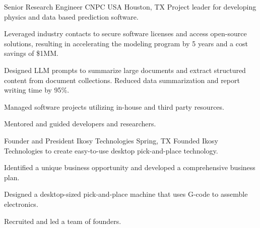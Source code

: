 \documentclass{leresume}
\begin{document}
            {Senior Research Engineer}
            {CNPC USA}
			{Houston, TX}
			Project leader for developing physics and data based prediction software.
		\begin{bulletedlist}
			
		\item
		
				Leveraged industry contacts to secure software licenses and access open-source solutions, resulting in accelerating the modeling program by 5 years and a cost savings of \$1MM.
			
		\item
		
				Designed LLM prompts to summarize large documents and extract structured content from document collections.  Reduced data summarization and report writing time by 95\%.
			
		\item
		
				Managed software projects utilizing in-house and third party resources.
			
		\item
		
				Mentored and guided developers and researchers.
			
		\end{bulletedlist}
	
            {Founder and President}
            {Ikosy Technologies}
			{Spring, TX}
			Founded Ikosy Technologies to create easy-to-use desktop pick-and-place technology.
		\begin{bulletedlist}
			
		\item
		
				Identified a unique business opportunity and developed a comprehensive business plan.
			
		\item
		
				Designed a desktop-sized pick-and-place machine that uses G-code to assemble electronics.
			
		\item
		
				Recruited and led a team of founders.
			
		\end{bulletedlist}
	
\end{document}
